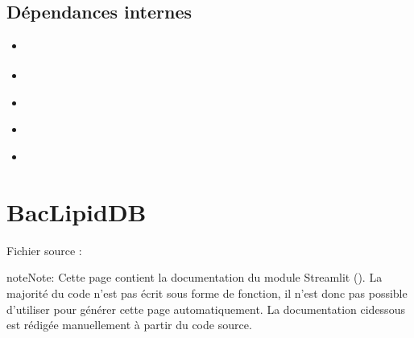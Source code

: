 \documentclass[letterpaper,10pt,english]{sphinxmanual}
\begin{document}
\section{Dépendances internes}
\label{\detokenize{1_Integration:dependances-internes}}\begin{itemize}
\item {} 
\sphinxAtStartPar
{\hyperref[\detokenize{api:module-utils.loading_MS1}]{}}

\item {} 
\sphinxAtStartPar
{}

\item {} 
\sphinxAtStartPar
{\hyperref[\detokenize{api:module-utils.molecular_weight}]{}}

\item {} 
\sphinxAtStartPar
{\hyperref[\detokenize{api:module-utils.monoisotopic}]{}}

\item {} 
\sphinxAtStartPar
{\hyperref[\detokenize{api:module-utils.neutral_mass}]{}}

\end{itemize}

\sphinxstepscope


\chapter{BacLipidDB}
\label{\detokenize{2_BacLipidDB:baclipiddb}}\label{\detokenize{2_BacLipidDB::doc}}
\sphinxAtStartPar
Fichier source : 

\begin{sphinxadmonition}{note}{Note:}
\sphinxAtStartPar
Cette page contient la documentation du module Streamlit ().
La majorité du code n’est pas écrit sous forme de fonction, il n’est donc pas possible d’utiliser 
pour générer cette page automatiquement. La documentation ci\sphinxhyphen{}dessous est rédigée manuellement
à partir du code source.
\end{sphinxadmonition}
\end{document}
